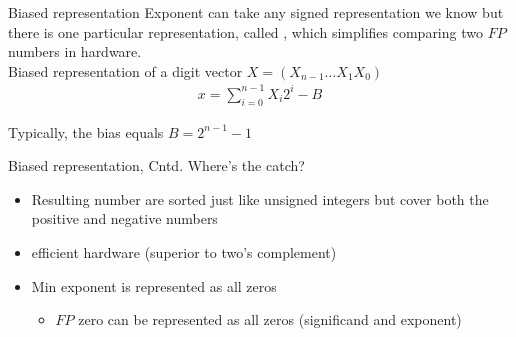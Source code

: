       \begin{parag}{Biased representation}
          Exponent can take any signed representation we know but there is one particular representation, called , which simplifies comparing two $FP$ numbers in hardware.
          \\
          Biased representation of a digit vector $X = (X_{n-1} \dots X_1 X_0)$
          \begin{align*}
              x = \sum_{i=0}^{n-1} X_i 2^i - B
          \end{align*}
          
          Typically, the bias equals $B = 2^{n-1} - 1$
      
      \end{parag}
     \begin{parag}{Biased representation, Cntd.}
         Where's the catch?
         \begin{itemize}
             \item Resulting number are sorted just like unsigned integers but cover both the positive and negative numbers
             \item efficient hardware (superior to two's complement)
             \item Min exponent is represented as all zeros
             \begin{itemize}
                 \item $FP$ zero can be represented as all zeros (significand and exponent)
             \end{itemize}
         \end{itemize}

     
     \end{parag}
      
